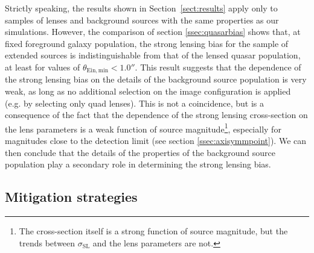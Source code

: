 \documentclass{aa}
\def\crosssect{\sigma_\mathrm{{SL}}}
\def\Sref#1{Section~\ref{#1}\xspace}
\begin{document}
Strictly speaking, the results shown in \Sref{sect:results} apply only to samples of lenses and background sources with the same properties as our simulations.
However, the comparison of section \ref{ssec:quasarbias} shows that, at fixed foreground galaxy population, the strong lensing bias for the sample of extended sources is indistinguishable from that of the lensed quasar population, at least for values of $\theta_{\mathrm{Ein,min}} < 1.0''$.
This result suggests that the dependence of the strong lensing bias on the details of the background source population is very weak, as long as no additional selection on the image configuration is applied (e.g. by selecting only quad lenses).
This is not a coincidence, but is a consequence of the fact that the dependence of the strong lensing cross-section on the lens parameters is a weak function of source magnitude\footnote{The cross-section itself is a strong function of source magnitude, but the trends between $\crosssect$ and the lens parameters are not.}, especially for magnitudes close to the detection limit (see section \ref{ssec:axisymmpoint}).
We can then conclude that the details of the properties of the background source population play a secondary role in determining the strong lensing bias.

\subsection{Mitigation strategies}

\end{document}
